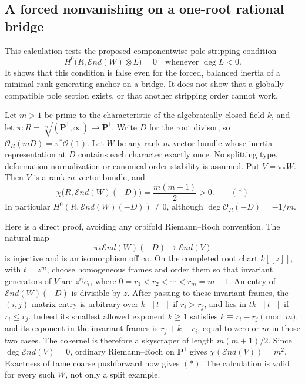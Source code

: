 \subsection*{A forced nonvanishing on a one-root rational bridge}

This calculation tests the proposed componentwise pole-stripping condition
\[
 H^0\bigl(R,\mathcal End(W)\otimes L\bigr)=0
       \quad\text{whenever }\deg L<0.
\]
It shows that this condition is false even for the forced, balanced inertia
of a minimal-rank generating anchor on a bridge. It does not show that a
globally compatible pole section exists, or that another stripping order
cannot work.

Let $m>1$ be prime to the characteristic of the algebraically closed field
$k$, and let $\pi:R=\sqrt[m]{(\mathbf P^1,\infty)}\to\mathbf P^1$.
Write $D$ for the root divisor, so $\mathcal O_R(mD)=\pi^*\mathcal O(1)$.
Let $W$ be any rank-$m$ vector bundle whose inertia representation at $D$
contains each character exactly once. No splitting type, deformation
normalization or canonical-order stability is assumed. Put $V=\pi_*W$.
Then $V$ is a rank-$m$ vector bundle, and
\[
 \chi\bigl(R,\mathcal End(W)(-D)\bigr)=\frac{m(m-1)}2>0.
                                                        \qquad(*)
\]
In particular $H^0(R,\mathcal End(W)(-D))\ne0$, although
$\deg\mathcal O_R(-D)=-1/m$.

Here is a direct proof, avoiding any orbifold Riemann--Roch convention.
The natural map
\[
 \pi_*\mathcal End(W)(-D)\longrightarrow\mathcal End(V)
\]
is injective and is an isomorphism off $\infty$. On the completed root
chart $k[[z]]$, with $t=z^m$, choose homogeneous frames and order them so
that invariant generators of $V$ are $z^{r_i}e_i$, where
$0=r_1<r_2<\cdots<r_m=m-1$. An entry of
$\mathcal End(W)(-D)$ is divisible by $z$. After passing to these invariant
frames, the $(i,j)$ matrix entry is arbitrary over $k[[t]]$ if $r_i>r_j$,
and lies in $t k[[t]]$ if $r_i\le r_j$.
Indeed its smallest allowed exponent $k\ge1$ satisfies
$k\equiv r_i-r_j\pmod m$, and its exponent in the invariant frames is
$r_j+k-r_i$, equal to zero or $m$ in those two cases.
The cokernel is therefore a skyscraper of length $m(m+1)/2$.
Since $\deg\mathcal End(V)=0$, ordinary Riemann--Roch on $\mathbf P^1$
gives $\chi(\mathcal End(V))=m^2$. Exactness of tame coarse pushforward
now gives $(*)$. The calculation is valid for every such $W$, not only
a split example.

